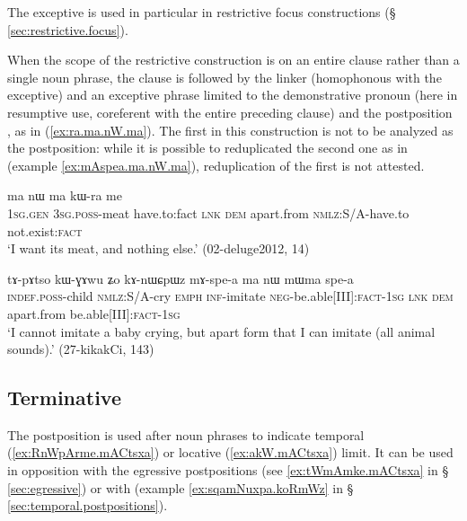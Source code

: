 The exceptive  is used in particular in restrictive focus constructions (§ \ref{sec:restrictive.focus}).

When the scope of the restrictive construction is on an entire clause rather than a single noun phrase, the clause is followed by the linker  (homophonous with the exceptive) and an exceptive phrase limited to the demonstrative pronoun  (here in resumptive use, coreferent with the entire preceding clause) and the postposition , as in (\ref{ex:ra.ma.nW.ma}). The first  in this construction is not to be analyzed as the postposition: while it is possible to reduplicated the second one as in  (example \ref{ex:mAspea.ma.nW.ma}), reduplication of the first  is not attested.

 \begin{exe}
 \ex \label{ex:ra.ma.nW.ma}
 \gll [aʑɯɣ ɯ-ɕa ra] ma nɯ ma kɯ-ra me \\
 \textsc{1sg}.\textsc{gen} \textsc{3sg}.\textsc{poss}-meat have.to:fact \textsc{lnk} \textsc{dem} apart.from \textsc{nmlz}:S/A-have.to not.exist:\textsc{fact} \\
 \glt `I want its meat, and nothing else.' (02-deluge2012, 14)
\end{exe}

 \begin{exe}
 \ex \label{ex:mAspea.ma.nW.ma}
 \gll tɤ-pɤtso kɯ-ɣɤwu ʑo kɤ-nɯɕpɯz mɤ-spe-a ma nɯ mɯma spe-a \\
 \textsc{indef}.\textsc{poss}-child \textsc{nmlz}:S/A-cry \textsc{emph} \textsc{inf}-imitate \textsc{neg}-be.able[III]:\textsc{fact}-\textsc{1sg} \textsc{lnk} \textsc{dem} apart.from be.able[III]:\textsc{fact}-\textsc{1sg}  \\
\glt  `I cannot imitate a baby crying, but apart form that I can imitate (all animal sounds).' (27-kikakCi, 143)
\end{exe}

\subsection{Terminative} \label{sec:terminative}  

The postposition  is used after noun phrases to indicate temporal (\ref{ex:RnWpArme.mACtsxa}) or locative (\ref{ex:akW.mACtsxa}) limit. It can be used in opposition with the egressive postpositions (see \ref{ex:tWmAmke.mACtsxa} in § \ref{sec:egressive}) or with  (example \ref{ex:sqamNuxpa.koRmWz} in § \ref{sec:temporal.postpositions}).


